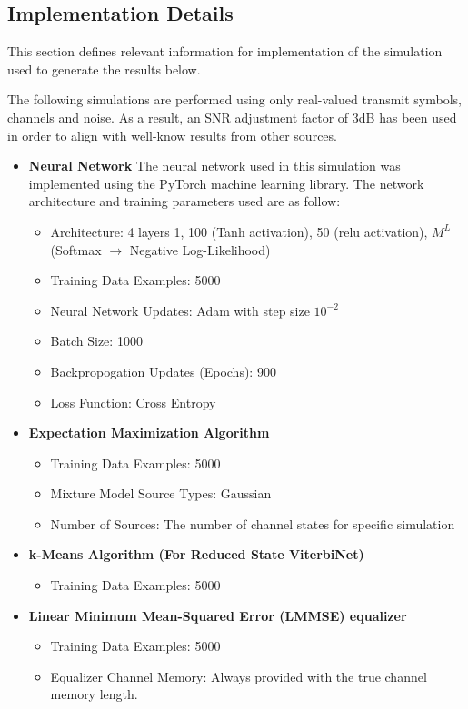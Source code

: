 \subsection{Implementation Details}\label{implementation_details}
This section defines relevant information for implementation of the simulation used to generate the results below.
\par
The following simulations are performed using only real-valued transmit symbols, channels and noise. As a result, an SNR adjustment factor of 3dB has been used in order to align with well-know results from other sources. 
\begin{itemize}
\item \textbf{Neural Network}
The neural network used in this simulation was implemented using the PyTorch machine learning library. The network architecture and training parameters used are as follow:
\begin{itemize}
\item Architecture: 4 layers {1, 100 (Tanh activation), 50 (relu activation), $M^L$ (Softmax $\rightarrow$ Negative Log-Likelihood)}
\item Training Data Examples: 5000
\item Neural Network Updates: Adam \cite{kingma2014adam} with step size $10^{-2}$ 
\item Batch Size: 1000 
\item Backpropogation Updates (Epochs): 900
\item Loss Function: Cross Entropy
\end{itemize}
\item \textbf{Expectation Maximization Algorithm}
\begin{itemize}
\item Training Data Examples: 5000
\item Mixture Model Source Types: Gaussian
\item Number of Sources: The number of channel states for specific simulation
\end{itemize}
\item \textbf{k-Means Algorithm (For Reduced State ViterbiNet)}
\begin{itemize}
\item Training Data Examples: 5000
\end{itemize}
\item \textbf{Linear Minimum Mean-Squared Error (LMMSE) equalizer}
\begin{itemize}
\item Training Data Examples: 5000
\item Equalizer Channel Memory: Always provided with the true channel memory length. 
\end{itemize}

\end{itemize}


